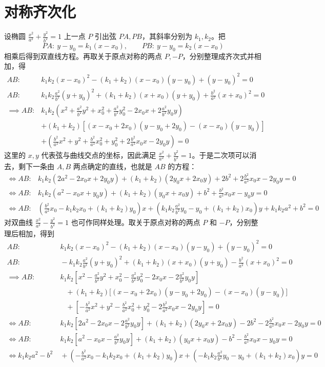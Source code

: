 \section{对称齐次化}
设椭圆 $\frac{x^2}{a^2}+\frac{y^2}{b^2}=1$ 上一点 $P$ 引出弦 $PA,PB$，其斜率分别为 $k_1,k_2$。把
\[
PA:\ y-y_0=k_1(x-x_0),\qquad PB:\ y-y_0=k_2(x-x_0)
\]
相乘后得到双直线方程。再取关于原点对称的两点 $P,-P$，分别整理成齐次式并相加，得
\begin{align*}
    AB:&k_1k_2(x - x_0)^2 - (k_1+k_2)(x - x_0)(y - y_0) + (y - y_0)^2=0\\
    AB:&k_1k_2\frac{a^2}{b^2}(y + y_0)^2+ (k_1+k_2)(x + x_0)(y + y_0) + \frac{b^2}{a^2}(x + x_0)^2=0\\
\implies AB:&k_1k_2\left(x^2+\frac{a^2}{b^2}y^2+x_0^2+\frac{a^2}{b^2}y_0^2-2x_0x+2\frac{a^2}{b^2}y_0y\right)\\
&+(k_1+k_2)\left[(x - x_0+2x_0)(y - y_0+2y_0)-(x - x_0)(y - y_0)\right]\\
&+\left(\frac{b^2}{a^2}x^2+y^2+\frac{b^2}{a^2}x_0^2+y_0^2+2\frac{b^2}{a^2}x_0x-2y_0y\right)=0
\end{align*}
这里的 $x,y$ 代表弦与曲线交点的坐标，因此满足 $\frac{x^2}{a^2}+\frac{y^2}{b^2}=1$。于是二次项可以消去，剩下一条由 $A,B$ 两点确定的直线，也就是 $AB$ 的方程：
\begin{align*}
\Longleftrightarrow AB:&k_1k_2\left(2a^2-2x_0x+2y_0y\right)+(k_1+k_2)(2y_0x+2x_0y)+2b^2+2\frac{b^2}{a^2}x_0x-2y_0y=0\\
\Longleftrightarrow AB:&k_1k_2\left(a^2-x_0x+y_0y\right)+(k_1+k_2)(y_0x+x_0y)+b^2+\frac{b^2}{a^2}x_0x-y_0y=0\\
\Longleftrightarrow AB:&\left( \frac{b^2}{a^2} x_0 - k_1k_2 x_0 + (k_1+k_2) y_0 \right) x + \left( k_1k_2 \frac{a^2}{b^2} y_0 - y_0 + (k_1+k_2) x_0 \right) y + k_1k_2 a^2 + b^2 = 0
\end{align*}
对双曲线 $\frac{x^2}{a^2}-\frac{y^2}{b^2}=1$ 也可作同样处理。取关于原点对称的两点 $P$ 和 $-P$，分别整理后相加，得到
\begin{align*}
AB:&\ k_1k_2(x - x_0)^2 - (k_1+k_2)(x - x_0)(y - y_0) + (y - y_0)^2=0\\
AB:&\ -k_1k_2\frac{a^2}{b^2}(y + y_0)^2+ (k_1+k_2)(x + x_0)(y + y_0) - \frac{b^2}{a^2}(x + x_0)^2=0\\
\implies AB:&\ k_1k_2\left[x^2-\frac{a^2}{b^2}y^2+x_0^2-\frac{a^2}{b^2}y_0^2-2x_0x-2\frac{a^2}{b^2}y_0y\right]\\
&\quad +(k_1+k_2)\big[(x - x_0+2x_0)(y - y_0+2y_0)-(x - x_0)(y - y_0)\big]\\
&\quad +\left[-\frac{b^2}{a^2}x^2+y^2-\frac{b^2}{a^2}x_0^2+y_0^2-2\frac{b^2}{a^2}x_0x-2y_0y\right]=0\\
\Longleftrightarrow AB:&\ k_1k_2\left[2a^2-2x_0x-2\frac{a^2}{b^2}y_0y\right]+(k_1+k_2)(2y_0x+2x_0y)-2b^2-2\frac{b^2}{a^2}x_0x-2y_0y=0\\
\Longleftrightarrow AB:&\ k_1k_2\left[a^2-x_0x-\frac{a^2}{b^2}y_0y\right]+(k_1+k_2)(y_0x+x_0y)-b^2-\frac{b^2}{a^2}x_0x-y_0y=0\\
\Leftrightarrow k_1k_2 a^2 - b^2 &\ + \left( -\frac{b^2}{a^2} x_0  - k_1k_2 x_0 + (k_1+k_2) y_0 \right) x + \left( -k_1k_2 \frac{a^2}{b^2} y_0 - y_0 + (k_1+k_2) x_0 \right) y  = 0
\end{align*}
